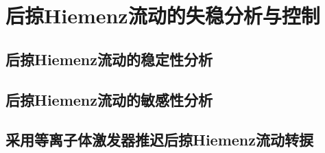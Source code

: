 \chapter{后掠Hiemenz流动的失稳分析与控制}
\section{后掠Hiemenz流动的稳定性分析}

\section{后掠Hiemenz流动的敏感性分析}

\section{采用等离子体激发器推迟后掠Hiemenz流动转捩}
